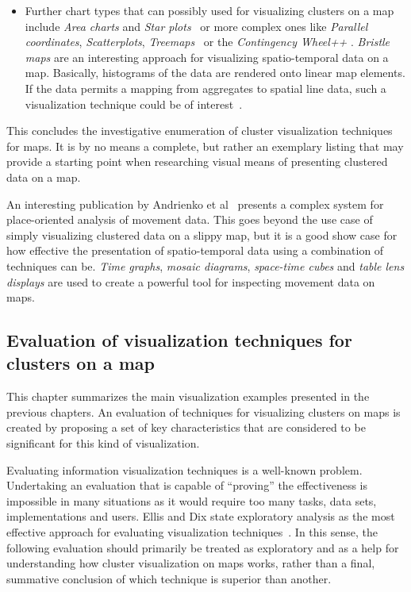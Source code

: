 \begin{itemize}
\begin{itemize}
\item Further chart types that can possibly used for visualizing clusters on a map include \textit{Area charts} and \textit{Star plots}~\cite{ladenhauf12dia} or more complex ones like \textit{Parallel coordinates}, \textit{Scatterplots}, \textit{Treemaps}~\cite{zhang07thesis} or the \textit{Contingency Wheel++} \cite{VAST2012}. \textit{Bristle maps} are an interesting approach for visualizing spatio-temporal data on a map. Basically, histograms of the data are rendered onto linear map elements. If the data permits a mapping from aggregates to spatial line data, such a visualization technique could be of interest~\cite{bristle}.

\end{itemize}

\end{itemize}

This concludes the investigative enumeration of cluster visualization techniques for maps. It is by no means a complete, but rather an exemplary listing that may provide a starting point when researching visual means of presenting clustered data on a map.

An interesting publication by Andrienko et al~\cite{andrienko2012sca} presents a complex system for place-oriented analysis of movement data. This goes beyond the use case of simply visualizing clustered data on a slippy map, but it is a good show case for how effective the presentation of spatio-temporal data using a combination of techniques can be. \textit{Time graphs}, \textit{mosaic diagrams}, \textit{space-time cubes} and \textit{table lens displays} are used to create a powerful tool for inspecting movement data on maps.

\subsection{Evaluation of visualization techniques for clusters on a map}
\label{chapter:eval-vis}

This chapter summarizes the main visualization examples presented in the previous chapters. An evaluation of techniques for visualizing clusters on maps is created by proposing a set of key characteristics that are considered to be significant for this kind of visualization.

Evaluating information visualization techniques is a well-known problem. Undertaking an evaluation that is capable of ``proving'' the effectiveness is impossible in many situations as it would require too many tasks, data sets, implementations and users. Ellis and Dix state exploratory analysis as the most effective approach for evaluating visualization techniques~\cite{ellis06eval, Delort10vis}. In this sense, the following evaluation should primarily be treated as exploratory and as a help for understanding how cluster visualization on maps works, rather than a final, summative conclusion of which technique is superior than another. 

